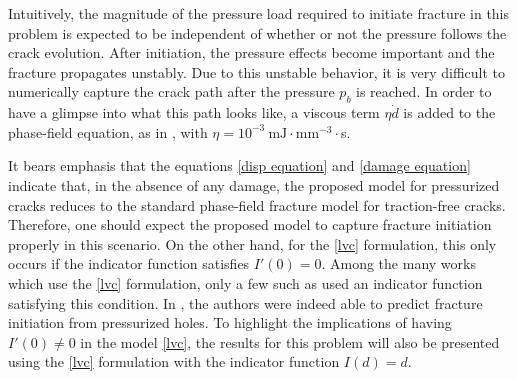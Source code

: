 

Intuitively, the magnitude of the pressure load required to initiate fracture in this problem is expected to be independent of whether or not the pressure follows the crack evolution. After initiation, the pressure effects become important and the fracture propagates unstably. Due to this unstable behavior, it is very difficult to numerically capture the crack path after the pressure $p_b$ is reached. In order to have a glimpse into what this path looks like, a viscous term $\eta \dot d$ is added to the phase-field equation, as in \cite{miehe2010phase}, with $\eta = 10^{-3}\  \text{mJ}\cdot\text{mm}^{-3}\cdot$s. 

It bears emphasis that the equations \eqref{disp equation} and \eqref{damage equation} indicate that, in the absence of any damage, the proposed model for pressurized cracks reduces to the standard phase-field fracture model for traction-free cracks. Therefore, one should expect the proposed model to capture fracture initiation properly in this scenario. On the other hand, for the \eqref{lvc} formulation, this only occurs if the indicator function satisfies $I'(0) = 0$. Among the many works which use the \eqref{lvc} formulation, only a few such as \cite{jiang2022phase, peco2017influence} used an indicator function satisfying this condition. In \cite{jiang2022phase}, the authors were indeed able to predict fracture initiation from pressurized holes. To highlight the implications of having $I'(0) \neq 0$ in the model \eqref{lvc}, the results for this problem will also be presented using the  \eqref{lvc} formulation with the indicator function $I(d) = d$.


